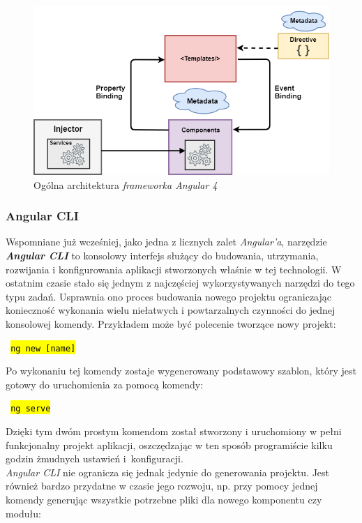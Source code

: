 \begin{figure}[ht]
	\centering
	\includegraphics[width=1\linewidth]{graphics/chapter-3/angular-architecture.png}
	\caption{Ogólna architektura \textit{frameworka Angular 4}}
	\label{fig:general-angular-architecture}
\end{figure}

	\subsubsection{Angular CLI}
\quad Wspomniane już wcześniej, jako jedna z licznych zalet \textit{Angular'a}, narzędzie \textbf{\textit{Angular CLI}} to konsolowy interfejs służący do budowania, utrzymania, rozwijania i konfigurowania aplikacji stworzonych właśnie w tej technologii. W ostatnim czasie stało się jednym z najczęściej wykorzystywanych narzędzi do tego typu zadań. 
Usprawnia ono proces budowania nowego projektu ograniczając konieczność wykonania wielu niełatwych i powtarzalnych czynności do jednej konsolowej komendy. Przykładem może być polecenie tworzące nowy projekt:

\vspace{2mm}

    \centerline{\texttt{\hl{ ng new [name] }}}

\vspace{2mm}

\noindent Po wykonaniu tej komendy zostaje wygenerowany podstawowy szablon, który jest gotowy do uruchomienia za pomocą komendy:

\vspace{2mm}

    \centerline{\texttt{\hl{ ng serve }}}

\vspace{2mm}

\noindent Dzięki tym dwóm prostym komendom został stworzony i uruchomiony w pełni funkcjonalny projekt aplikacji, oszczędzając w ten sposób programiście kilku godzin żmudnych ustawień i~konfiguracji.\\
\textit{Angular CLI} nie ogranicza się jednak jedynie do generowania projektu. Jest również bardzo przydatne w czasie jego rozwoju, np. przy pomocy jednej komendy generując wszystkie potrzebne pliki dla nowego komponentu czy modułu:

